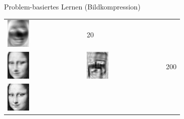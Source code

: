 \documentclass[10pt,aspectratio=169]{beamer}
\begin{document}
\begin{frame}[fragile]{Problem-basiertes Lernen (Bildkompression)}
\begin{minipage}{0.3\textwidth}
\begin{tabular}{m{1.0cm} m{1.0cm} c}
			\includegraphics[width=0.3\textwidth]{images/compression/chair_20} & 20 \pause \\
			\includegraphics[width=0.3\textwidth]{images/compression/mona_lisa_200} &
			\includegraphics[width=0.3\textwidth]{images/compression/chair_200} & 200 \pause \\
			\includegraphics[width=0.3\textwidth]{images/compression/mona_lisa_2000} &

\end{tabular}
\end{minipage}
\end{frame}
\end{document}
